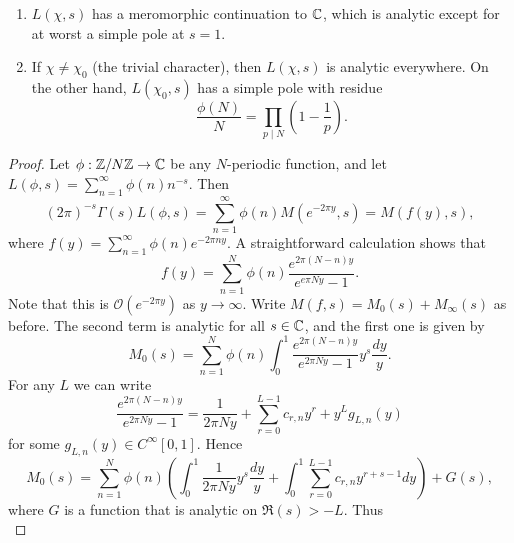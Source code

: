 \documentclass{memoir}
\begin{document}
\begin{thm}
    \begin{enumerate}
        \item $L(\chi,s)$ has a meromorphic continuation to $\mathbb{C}$, which is analytic except for at worst a simple pole at $s=1$.
        \item If $\chi \ne \chi_0$ (the trivial character), then $L(\chi,s)$ is analytic everywhere. On the other hand, $L(\chi_0,s)$ has a simple pole with residue 
            \begin{equation}
                \frac{\phi(N)}N = \prod_{p\mid N} \left(1-\frac1p\right).
            \end{equation}
    \end{enumerate}
\end{thm}
\begin{proof}
    Let $\phi:\mathbb{Z}/N\mathbb{Z}\to \mathbb{C}$ be any $N$-periodic function, and let $L(\phi,s) = \sum_{n = 1}^\infty\phi(n)n^{-s}$.
    Then
    \begin{equation}
        (2\pi)^{-s}\Gamma(s)L(\phi,s) = \sum_{n=1}^\infty \phi(n)M(e^{-2\pi y},s) = M(f(y),s),
    \end{equation}
    where $f(y) = \sum_{n=1}^\infty\phi(n)e^{-2\pi n y}$.
    A straightforward calculation shows that 
    \begin{equation}
        f(y) = \sum_{n = 1}^N \phi(n) \frac{e^{2\pi(N-n)y}}{e^{e\pi Ny}-1}.
    \end{equation}
    Note that this is $\mathcal O(e^{-2\pi y})$ as $y\to\infty$.
    Write $M(f,s) = M_0(s)+M_\infty(s)$ as before.
    The second term is analytic for all $s\in\mathbb{C}$, and the first one is given by
    \begin{equation}
        M_0(s) = \sum_{n=1}^N\phi(n)\int_0^1\frac{e^{2\pi(N-n)y}}{e^{2\pi Ny}-1} y^s\frac{dy}y.
    \end{equation}
    For any $L$ we can write
    \begin{equation}
        \frac{e^{2\pi(N-n)y}}{e^{2\pi Ny}-1} = \frac1{2\pi Ny} + \sum_{r=0}^{L-1}c_{r,n}y^r + y^Lg_{L,n}(y)
    \end{equation}
    for some $g_{L,n}(y)\in C^\infty[0,1]$.
    Hence
    \begin{equation}
        M_0(s) = \sum_{n=1}^N\phi(n) \left(\int_0^1\frac1{2\pi Ny}y^s\frac{dy}y + \int_0^1\sum_{r=0}^{L-1}c_{r,n}y^{r+s-1}dy\right)+G(s),
    \end{equation}
    where $G$ is a function that is analytic on $\Re(s)>-L$.
    Thus
    \begin{equation}

\end{equation}
\end{proof}
\end{document}
